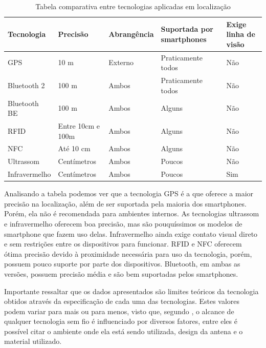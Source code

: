 \documentclass[english,brazilian]{UNISINOSmonografia}
\begin{document}
\begin{table}
	\caption{Tabela comparativa entre tecnologias aplicadas em localização}
	\label{tab:tecnologiasLocalizacao}
		\begin{tabular}{ p{} | p{2cm} | p{} | p{3cm} | p{3cm} }
			\hline
				Tecnologia & Precisão & Abrangência & Suportada por smartphones & Exige linha de visão   \\ \hline
				GPS & 10 m & Externo & Praticamente todos & Não   \\ \hline
				Bluetooth 2 & 100 m & Ambos & Praticamente todos & Não   \\ \hline
				Bluetooth BE & 100 m & Ambos & Alguns & Não   \\ \hline
				RFID & Entre 10cm e 100m & Ambos & Alguns & Não   \\ \hline
				NFC & Até 10 cm & Ambos & Alguns & Não   \\ \hline
				Ultrassom & Centímetros & Ambos & Poucos & Não   \\ \hline
				Infravermelho & Centímetros & Ambos & Poucos & Sim   \\ \hline
			\end{tabular}
\end{table}

Analisando a tabela podemos ver que a tecnologia GPS é a que oferece a maior precisão na localização, além de ser suportada pela maioria dos smartphones. Porém, ela não é recomendada para ambientes internos. As tecnologias ultrassom e infravermelho oferecem boa precisão, mas são pouquíssimos os modelos de smartphone que fazem uso delas. Infravermelho ainda exige contato visual direto e sem restrições entre os dispositivos para funcionar. RFID e NFC oferecem ótima precisão devido à proximidade necessária para uso da tecnologia, porém, possuem pouco suporte por parte dos dispositivos. Bluetooth, em ambas as versões, possuem precisão média e são bem suportadas pelos smartphones.

Importante ressaltar que os dados apresentados são limites teóricos da tecnologia obtidos através da especificação de cada uma das tecnologias. Estes valores podem variar para mais ou para menos, visto que, segundo , o alcance de qualquer tecnologia sem fio é influenciado por diversos fatores, entre eles é possível  citar o ambiente onde ela está sendo utilizada, design da antena e o material utilizado.

\end{document}
